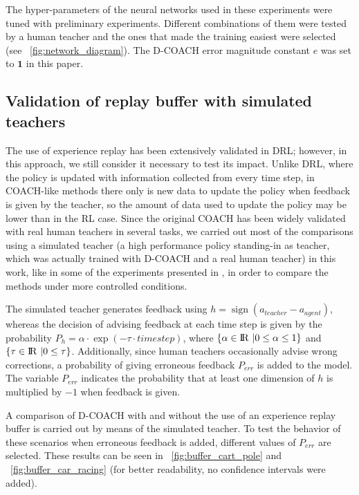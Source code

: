 The hyper-parameters of the neural networks used in these experiments were tuned with preliminary experiments. Different combinations of them were tested by a human teacher and the ones that made the training easiest were selected (see \figurename~{\ref{fig:network_diagram}}). The D-COACH error magnitude constant $e$ was set to $\textbf{1}$ in this paper.

\subsection{Validation of replay buffer with simulated teachers}
The use of experience replay has been extensively validated in DRL; however, in this approach, we  still consider it necessary to test its impact. Unlike DRL, where the policy is updated with information collected from every time step, in COACH-like methods there only is new data to update the policy when feedback is given by the teacher, so the amount of data used to update the policy may be lower than in the RL case. Since the original COACH has been widely validated with real human teachers in several tasks, we carried out most of the comparisons using  a simulated teacher (a high performance policy standing-in as teacher, which was actually trained with D-COACH and a real human teacher) in this work, like in some of the experiments presented in \cite{Celemin2018AnInteractive}, in order to compare the methods under more controlled conditions. 

The simulated teacher generates feedback using $h = \operatorname{sign}(a_{\mathit{teacher}} - a_{\mathit{agent}})$, whereas the decision of advising feedback at each time step is given by the probability $P_{h} = \alpha \cdot\exp(-\tau\cdot \mathit{timestep})$, where $\{\alpha \in {\rm I\!R}\ | 0 \le \alpha \le 1\}$ and $\{\tau \in {\rm I\!R}\ | 0 \le \tau\}$. Additionally, since human teachers occasionally advise wrong corrections, a probability of giving erroneous feedback $P_{\mathit{err}}$ is added to the model. The variable $P_{\mathit{err}}$ indicates the probability that at least one dimension of $h$ is multiplied by $-1$ when feedback is given.

A comparison of D-COACH with and without the use of an experience replay buffer is carried out by means of the simulated teacher. To test the behavior of these scenarios when erroneous feedback is added, different values of $P_{\mathit{err}}$ are selected. These results can be seen in \figurename~{\ref{fig:buffer_cart_pole}} and \figurename~{\ref{fig:buffer_car_racing}} (for better readability, no confidence intervals were added).

